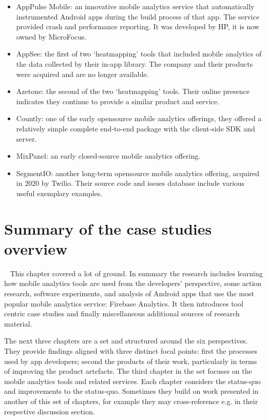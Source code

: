 \begin{itemize}
    \item AppPulse Mobile: an innovative mobile analytics service that automatically instrumented Android apps during the build process of that app. The service provided crash and performance reporting. It was developed by HP, it is now owned by MicroFocus. 
    \item AppSee: the first of two `heatmapping' tools that included mobile analytics of the data collected by their in-app library. The company and their products were acquired and are no longer available.
    \item Azetone: the second of the two `heatmapping' tools. Their online presence indicates they continue to provide a similar product and service.
    \item Countly: one of the early opensource mobile analytics offerings, they offered a relatively simple complete end-to-end package with the client-side SDK and server.
    \item MixPanel: an early closed-source mobile analytics offering.
    \item SegmentIO: another long-term opensource mobile analytics offering, acquired in 2020 by Twilio. Their source code and issues database include various useful exemplary examples. 
\end{itemize}

\clearpage


\section{Summary of the case studies overview}~\label{case-study-overview-summary}
This chapter covered a lot of ground. In summary the research includes learning how mobile analytics tools are used from the developers' perspective, some action research, software experiments, and analysis of Android apps that use the most popular mobile analytics service: Firebase Analytics. It then introduces tool centric case studies and finally miscellaneous additional sources of research material.

The next three chapters are a set and structured around the six perspectives. They provide findings aligned with three distinct focal points: first the processes used by app developers; second the products of their work, particularly in terms of improving the product artefacts. The third chapter in the set focuses on the mobile analytics tools and related services. Each chapter considers the status-quo and improvements to the status-quo. Sometimes they build on work presented in another of this set of chapters, for example they may cross-reference e.g. in their respective discussion section.

